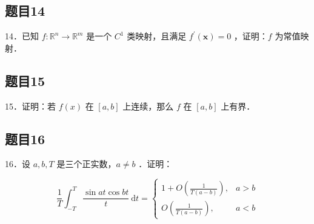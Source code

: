 \documentclass{article}
\begin{document}
\subsection{题目14}
14．已知 \(f: \mathbb{R}^{n} \rightarrow \mathbb{R}^{m}\) 是一个 \(C^{1}\) 类映射，且满足 \(f^{\prime}(\mathbf{x})=0\) ，证明：\(f\) 为常值映射．

\subsection{题目15}
15．证明：若 \(f(x)\) 在 \([a, b]\) 上连续，那么 \(f\) 在 \([a, b]\) 上有界．

\subsection{题目16}
16．设 \(a, b, T\) 是三个正实数，\(a \neq b\) ．证明：

\[
\frac{1}{T} \int_{-T}^{T} \frac{\sin a t \cos b t}{t} \mathrm{~d} t= \begin{cases}1+O\left(\frac{1}{T(a-b)}\right), & a>b \\ O\left(\frac{1}{T(a-b)}\right), & a<b\end{cases}
\]
\end{document}
